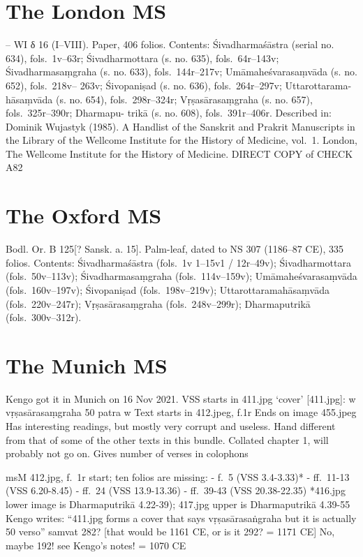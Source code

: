 \documentclass[12pt]{book}
\begin{document}
{%
\section{The London MS}\label{the-london-ms}}



-- WI δ 16 (I--VIII). Paper, 406 folios. Contents: Śivadharmaśāstra
(serial no. 634), fols.~1v--63r; Śivadharmottara (s. no. 635),
fols.~64r--143v; Śivadharmasaṃgraha (s. no. 633), fols.~144r--217v;
Umāmaheśvarasaṃvāda (s. no. 652), fols.~218v-- 263v; Śivopaniṣad (s. no.
636), fols.~264r--297v; Uttarottarama-hāsaṃvāda (s. no. 654),
fols.~298r--324r; Vṛṣasārasaṃgraha (s. no. 657), fols.~325r--390r;
Dharmapu- trikā (s. no. 608), fols.~391r--406r. Described in: Dominik
Wujastyk (1985). A Handlist of the Sanskrit and Prakrit Manuscripts in
the Library of the Wellcome Institute for the History of Medicine,
vol.~1. London, The Wellcome Institute for the History of Medicine.
DIRECT COPY of CHECK A82

{%
\section{The Oxford MS}\label{the-oxford-ms}}

Bodl. Or. B 125{[}? Sansk. a. 15{]}. Palm-leaf, dated to NS 307
(1186--87 CE), 335 folios. Contents: Śivadharmaśāstra (fols.~1v 1--15v1
/ 12r--49v); Śivadharmottara (fols.~50v--113v); Śivadharmasaṃgraha
(fols.~114v--159v); Umāmaheśvarasaṃvāda (fols.~160v--197v); Śivopaniṣad
(fols.~198v--219v); Uttarottaramahāsaṃvāda (fols.~220v--247r);
Vṛṣasārasaṃgraha (fols.~248v--299r); Dharmaputrikā (fols.~300v--312r).

{%
\section{The Munich MS}\label{the-munich-ms}}

Kengo got it in Munich on 16 Nov 2021. VSS starts in 411.jpg `cover'
{[}411.jpg{]}: \textbar{}\textbar{}w\textbar{}\textbar{}
vṛṣasārasaṃgraha 50 patra \textbar{}\textbar{}w\textbar{}\textbar{} Text
starts in 412.jpeg, f.1r Ends on image 455.jpeg Has interesting
readings, but mostly very corrupt and useless. Hand different from that
of some of the other texts in this bundle. Collated chapter 1, will
probably not go on. Gives number of verses in colophons

msM 412.jpg, f.~1r start; ten folios are missing: - f.~5 (VSS 3.4-3.33)*
- ff.~11-13 (VSS 6.20-8.45) - ff.~24 (VSS 13.9-13.36) - ff.~39-43 (VSS
20.38-22.35) *416.jpg lower image is Dharmaputrikā 4.22-39); 417.jpg
upper is Dharmaputrikā 4.39-55 Kengo writes: ``411.jpg forms a cover
that says vṛṣasārasaṅgraha but it is actually 50 verso'' samvat 282?
{[}that would be 1161 CE, or is it 292? = 1171 CE{]} No, maybe 192! see
Kengo's notes! = 1070 CE
\end{document}
